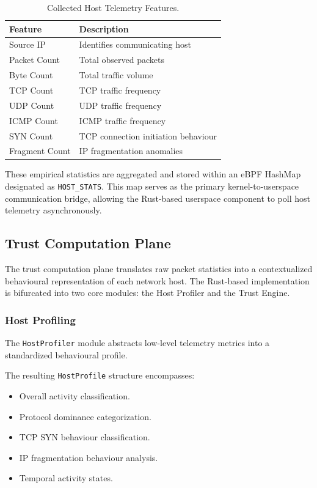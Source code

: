 \documentclass[conference]{IEEEtran}
\begin{document}
\begin{table}[h]
\centering
\caption{Collected Host Telemetry Features.}
\label{tab:features}
\begin{tabular}{ll}
\toprule
Feature & Description \\
\midrule
Source IP & Identifies communicating host \\
Packet Count & Total observed packets \\
Byte Count & Total traffic volume \\
TCP Count & TCP traffic frequency \\
UDP Count & UDP traffic frequency \\
ICMP Count & ICMP traffic frequency \\
SYN Count & TCP connection initiation behaviour \\
Fragment Count & IP fragmentation anomalies \\
\bottomrule
\end{tabular}
\end{table}

These empirical statistics are aggregated and stored within an eBPF HashMap designated as \texttt{HOST\_STATS}. This map serves as the primary kernel-to-userspace communication bridge, allowing the Rust-based userspace component to poll host telemetry asynchronously.


\subsection{Trust Computation Plane}

The trust computation plane translates raw packet statistics into a contextualized behavioural representation of each network host. The Rust-based implementation is bifurcated into two core modules: the Host Profiler and the Trust Engine.

\subsubsection{Host Profiling}
The \texttt{HostProfiler} module abstracts low-level telemetry metrics into a standardized behavioural profile. 

The resulting \texttt{HostProfile} structure encompasses:
\begin{itemize}
\item Overall activity classification.
\item Protocol dominance categorization.
\item TCP SYN behaviour classification.
\item IP fragmentation behaviour analysis.
\item Temporal activity states.
\end{itemize}
\end{document}
